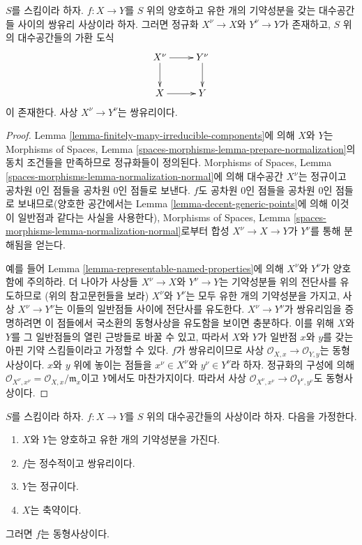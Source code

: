 \begin{lemma}
\label{lemma-birational-induced-morphism-normalizations}
$S$를 스킴이라 하자. $f : X \to Y$를 $S$ 위의 양호하고 유한 개의
기약성분을 갖는 대수공간들 사이의 쌍유리 사상이라 하자.
그러면 정규화 $X^\nu \to X$와 $Y^\nu \to Y$가 존재하고,
$S$ 위의 대수공간들의 가환 도식
$$
\xymatrix{
X^\nu \ar[r] \ar[d] &  Y^\nu \ar[d] \\
X \ar[r] & Y
}
$$
이 존재한다. 사상 $X^\nu \to Y^\nu$는 쌍유리이다.
\end{lemma}

\begin{proof}
Lemma \ref{lemma-finitely-many-irreducible-components}에 의해 $X$와
$Y$는 Morphisms of Spaces, Lemma
\ref{spaces-morphisms-lemma-prepare-normalization}의 동치 조건들을
만족하므로 정규화들이 정의된다. Morphisms of Spaces, Lemma
\ref{spaces-morphisms-lemma-normalization-normal}에 의해 대수공간
$X^\nu$는 정규이고 공차원 $0$인 점들을 공차원 $0$인 점들로 보낸다.
$f$도 공차원 $0$인 점들을 공차원 $0$인 점들로 보내므로(양호한
공간에서는 Lemma \ref{lemma-decent-generic-points}에 의해 이것이
일반점과 같다는 사실을 사용한다), Morphisms of Spaces, Lemma
\ref{spaces-morphisms-lemma-normalization-normal}로부터 합성
$X^\nu \to X \to Y$가 $Y^\nu$를 통해 분해됨을 얻는다.

\medskip\noindent
예를 들어 Lemma \ref{lemma-representable-named-properties}에 의해
$X^\nu$와 $Y^\nu$가 양호함에 주의하라. 더 나아가 사상들
$X^\nu \to X$와 $Y^\nu \to Y$는 기약성분들 위의 전단사를 유도하므로
(위의 참고문헌들을 보라) $X^\nu$와 $Y^\nu$는 모두 유한 개의
기약성분을 가지고, 사상 $X^\nu \to Y^\nu$는 이들의 일반점들 사이에
전단사를 유도한다.
$X^\nu \to Y^\nu$가 쌍유리임을 증명하려면 이 점들에서 국소환의
동형사상을 유도함을 보이면 충분하다. 이를 위해 $X$와 $Y$를 그
일반점들의 열린 근방들로 바꿀 수 있고, 따라서 $X$와 $Y$가 일반점
$x$와 $y$를 갖는 아핀 기약 스킴들이라고 가정할 수 있다.
$f$가 쌍유리이므로 사상
$\mathcal{O}_{X, x} \to \mathcal{O}_{Y, y}$는 동형사상이다.
$x$와 $y$ 위에 놓이는 점들을 $x^\nu \in X^\nu$와
$y^\nu \in Y^\nu$라 하자. 정규화의 구성에 의해
$\mathcal{O}_{X^\nu, x^\nu} = \mathcal{O}_{X, x}/\mathfrak m_x$이고
$Y$에서도 마찬가지이다. 따라서 사상
$\mathcal{O}_{X^\nu, x^\nu} \to \mathcal{O}_{Y^\nu, y^\nu}$도
동형사상이다.
\end{proof}

\begin{lemma}
\label{lemma-finite-birational-over-normal}
$S$를 스킴이라 하자. $f : X \to Y$를 $S$ 위의 대수공간들의
사상이라 하자. 다음을 가정한다.
\begin{enumerate}
\item $X$와 $Y$는 양호하고 유한 개의 기약성분을 가진다.
\item $f$는 정수적이고 쌍유리이다.
\item $Y$는 정규이다.
\item $X$는 축약이다.
\end{enumerate}
그러면 $f$는 동형사상이다.
\end{lemma}

